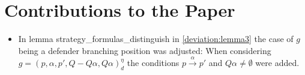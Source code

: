 \section{Contributions to the Paper}

\begin{itemize}
\item In lemma strategy\_formulas\_distinguish in \ref{deviation:lemma3} the case of $g$ being a defender branching position was adjusted: 
When considering $g=(p,\alpha ,p', Q- Q \alpha, Q \alpha)_d^\eta$ the conditions $p \overset{\alpha}{\longrightarrow} p'$ and $Q \alpha \neq \emptyset$ were 
added. 
\end{itemize}